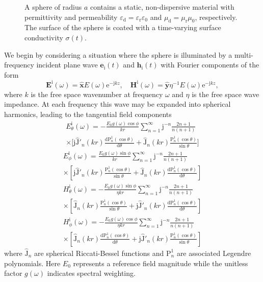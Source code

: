 \documentclass[article]{IEEEtran}
\newcommand{\T}[1]{\mathrm{#1}}
\newcommand{\V}[1]{\boldsymbol{#1}}
\renewcommand{\u}[1]{\boldsymbol{\hat{#1}}}
\newcommand{\Jh}{\hat{\T{J}}}
\begin{document}
\begin{figure}
    \centering
   
    \caption{A sphere of radius $a$ contains a static, non-dispersive material with permittivity and permeability $\varepsilon_\T{d} = \varepsilon_\T{r}\varepsilon_0$ and $\mu_\T{d} = \mu_\T{r}\mu_0$, respectively.  The surface of the sphere is coated with a time-varying surface conductivity $\sigma(t)$.}
    \label{fig:schem}
\end{figure}

We begin by considering a situation where the sphere is illuminated by a multi-frequency incident plane wave $\V{e}_\T{i}(t)$ and $\V{h}_\T{i}(t)$ with Fourier components of the form
\begin{equation}
    \V{E}^\T{i}(\omega) = \u{x}E(\omega)\T{e}^{-\T{j}kz},\quad
    \V{H}^\T{i}(\omega) = \u{y}\eta^{-1}E(\omega)\T{e}^{-\T{j}kz},
\end{equation}
where $k$ is the free space wavenumber at frequency $\omega$ and $\eta$ is the free space wave impedance.  At each frequency this wave may be expanded into spherical harmonics, leading to the tangential field components \cite[\S 7.4.3]{jin2011theory}
\begin{multline} \label{eq:pwexp-et}
    E_\theta^\T{i}(\omega) = - \frac{E_0 g(\omega)\cos\phi}{kr}\sum_{n=1}^{\infty} \T{j}^{-n}\frac{2n+1}{n(n+1)}\\\times\biggl[\T{j}\Jh'_n(kr)\frac{\T{d}\T{P}_n^1(\cos\theta)}{\T{d}\theta}+\Jh_n(kr)\frac{\T{P}_n^1(\cos\theta)}{\sin\theta}\biggr]
\end{multline}
\begin{multline}
    E_\phi^\T{i}(\omega) = \frac{E_0 g(\omega)\sin\phi}{kr}\sum_{n=1}^{\infty} \T{j}^{-n}\frac{2n+1}{n(n+1)}\\\times\left[\T{j}\Jh'_n(kr)\frac{\T{P}_n^1(\cos\theta)}{\sin\theta}+\Jh_n(kr)\frac{\T{d}\T{P}_n^1(\cos\theta)}{\T{d}\theta}\right]
\end{multline}
\begin{multline}
    H_\theta^\T{i}(\omega) = - \frac{E_0 g(\omega)\sin\phi}{\eta kr}\sum_{n=1}^{\infty} \T{j}^{-n}\frac{2n+1}{n(n+1)}\\\times\left[\Jh_n(kr)\frac{\T{P}_n^1(\cos\theta)}{\sin\theta}+\T{j}\Jh'_n(kr)\frac{\T{d}\T{P}_n^1(\cos\theta)}{\T{d}\theta}\right]
\end{multline}
\begin{multline}\label{eq:pwexp-hp}
    H_\phi^\T{i}(\omega) = - \frac{E_0 g(\omega)\cos\phi}{\eta kr}\sum_{n=1}^{\infty} \T{j}^{-n}\frac{2n+1}{n(n+1)}\\\times\left[\Jh_n(kr)\frac{\T{d}\T{P}_n^1(\cos\theta)}{\T{d}\theta}+\T{j}\Jh'_n(kr)\frac{\T{P}_n^1(\cos\theta)}{\sin\theta}\right]
\end{multline}
where $\Jh_n$ are spherical Riccati-Bessel functions and $\T{P}_n^1$ are associated Legendre polynomials.  Here $E_0$ represents a reference field magnitude while the unitless factor $g(\omega)$ indicates spectral weighting.
\end{document}
